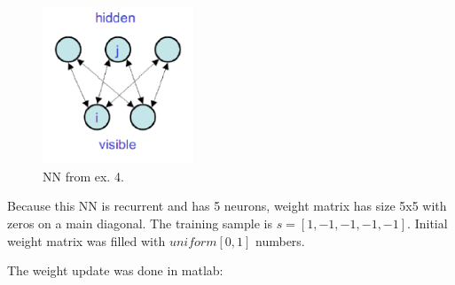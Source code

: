 \documentclass[a4paper, 12pt]{article}
\begin{document}
\begin{figure}[h]
  \centering
  \caption{NN from ex. 4.\label{fig:4NN}}
  \includegraphics[width=0.4\textwidth]{4}
\end{figure}

Because this NN is recurrent and has 5 neurons, weight matrix has size 5x5 with zeros on a main diagonal. The training sample is $s=[1 ,-1,-1,-1,-1]$. Initial weight matrix was filled with $uniform[0,1]$ numbers.

The weight update was done in matlab:

\medskip


\end{document}
